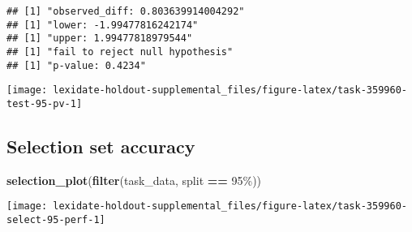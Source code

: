 \documentclass[
]{book}
\newenvironment{Shaded}{\begin{snugshade}}{\end{snugshade}}
\newcommand{\AttributeTok}[1]{\textcolor[rgb]{0.13,0.29,0.53}{#1}}
\newcommand{\DecValTok}[1]{\textcolor[rgb]{0.00,0.00,0.81}{#1}}
\newcommand{\FunctionTok}[1]{\textcolor[rgb]{0.13,0.29,0.53}{\textbf{#1}}}
\newcommand{\NormalTok}[1]{#1}
\newcommand{\OtherTok}[1]{\textcolor[rgb]{0.56,0.35,0.01}{#1}}
\newcommand{\SpecialCharTok}[1]{\textcolor[rgb]{0.81,0.36,0.00}{\textbf{#1}}}
\newcommand{\StringTok}[1]{\textcolor[rgb]{0.31,0.60,0.02}{#1}}
\begin{document}
\begin{Shaded}
\end{Shaded}

\begin{verbatim}
## [1] "observed_diff: 0.803639914004292"
## [1] "lower: -1.99477816242174"
## [1] "upper: 1.99477818979544"
## [1] "fail to reject null hypothesis"
## [1] "p-value: 0.4234"
\end{verbatim}

\texttt{[image: lexidate-holdout-supplemental\_files/figure-latex/task-359960-test-95-pv-1]}

\hypertarget{selection-set-accuracy-49}{%
\subsection{Selection set accuracy}\label{selection-set-accuracy-49}}

\begin{Shaded}
\begin{Highlighting}[]
\FunctionTok{selection\_plot}\NormalTok{(}\FunctionTok{filter}\NormalTok{(task\_data, split }\SpecialCharTok{==} \StringTok{\textquotesingle{}95\%\textquotesingle{}}\NormalTok{))}
\end{Highlighting}
\end{Shaded}

\texttt{[image: lexidate-holdout-supplemental\_files/figure-latex/task-359960-select-95-perf-1]}
\end{document}
